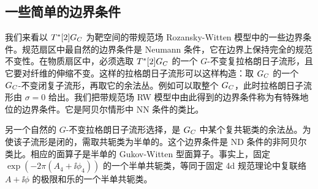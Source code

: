 \subsection{一些简单的边界条件}

我们来看以 $T^*[2]G_C$ 为靶空间的带规范场 Rozansky-Witten 模型中的一些边界条件。规范扇区中最自然的边界条件是 Neumann 条件，它在边界上保持完全的规范不变性。在物质扇区中，必须选取 $T^*[2]G_C$ 的一个 $G$-不变复拉格朗日子流形，且它要对纤维的伸缩不变。这样的拉格朗日子流形可以这样构造：取 $G_C$ 的一个 $G_C$-不变闭复子流形，再取它的余法丛。例如可以取整个 $G_C$，此时拉格朗日子流形由 $\sigma=0$ 给出。我们把带规范场 RW 模型中由此得到的边界条件称为有特殊地位的边界条件。它是阿贝尔情形中 NN 条件的类比。


另一个自然的 $G$-不变拉格朗日子流形选择，是 $G_C$ 中某个复共轭类的余法丛。为使该子流形是闭的，需取共轭类为半单的。这个边界条件是 ND 条件的非阿贝尔类比。相应的面算子是半单的 Gukov-Witten 型面算子。事实上，固定 $\exp(-2\pi(A_4+\ii\phi_4))$ 的一个半单共轭类，等同于固定 4d 规范理论中复联络 $A+\ii\phi$ 的极限和乐的一个半单共轭类。

